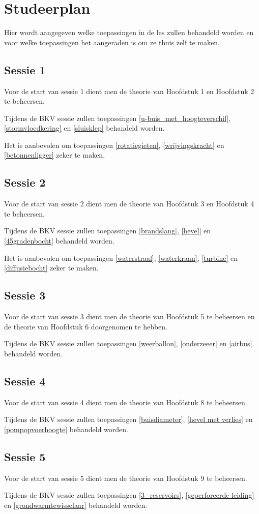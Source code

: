 \chapter{Studeerplan}
Hier wordt aangegeven welke toepassingen in de les zullen behandeld worden en voor welke toepassingen het aangeraden is om ze thuis zelf te maken.
	\section*{Sessie 1}
Voor de start van sessie 1 dient men de theorie van Hoofdstuk 1 en Hoofdstuk 2 te beheersen.

Tijdens de BKV sessie zullen toepassingen \ref{u-buis_met_hoogteverschil}, \ref{stormvloedkering} en \ref{sluisklep} behandeld worden.

Het is aanbevolen om toepassingen \ref{rotatiegieten}, \ref{wrijvingskracht} en \ref{betonnenligger} zeker te maken.
	
	\section*{Sessie 2}
Voor de start van sessie 2 dient men de theorie van Hoofdstuk 3 en Hoofdstuk 4 te beheersen.

Tijdens de BKV sessie zullen toepassingen \ref{brandslang}, \ref{hevel} en \ref{45gradenbocht} behandeld worden.

Het is aanbevolen om toepassingen \ref{waterstraal}, \ref{waterkraan}, \ref{turbine} en \ref{diffusiebocht} zeker te maken.

	\section*{Sessie 3}
Voor de start van sessie 3 dient men de theorie van Hoofdstuk 5 te beheersen en de theorie van Hoofdstuk 6 doorgenomen te hebben.

Tijdens de BKV sessie zullen toepassingen \ref{weerballon}, \ref{onderzeeer} en \ref{airbus} behandeld worden.

	\section*{Sessie 4}
Voor de start van sessie 4 dient men de theorie van Hoofdstuk 8 te beheersen.

Tijdens de BKV sessie zullen toepassingen \ref{buisdiameter}, \ref{hevel met verlies} en \ref{pompopvoerhoogte} behandeld worden.
	
	\section*{Sessie 5}
Voor de start van sessie 5 dient men de theorie van Hoofdstuk 9 te beheersen.

Tijdens de BKV sessie zullen toepassingen \ref{3_reservoirs}, \ref{geperforeerde leiding} en \ref{grondwarmtewisselaar} behandeld worden.